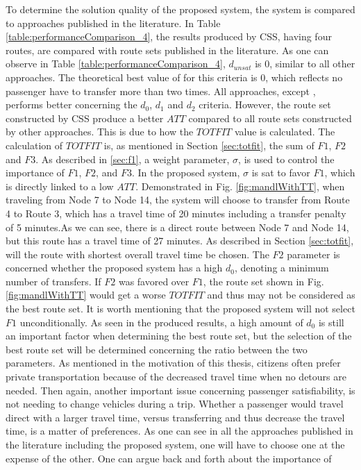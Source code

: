 
To determine the solution quality of the proposed system, the system is compared to approaches published in the literature. In Table \vref{table:performanceComparison_4}, the results produced by CSS, having four routes, are compared with route sets published in the literature. As one can observe in Table \vref{table:performanceComparison_4},  $d_{unsat}$ is 0, similar to all other approaches. The theoretical best value of for this criteria is 0, which reflects no passenger have to transfer more than two times. All approaches, except \citep{mandl79, kidwai98, chakroborty02}, performs better concerning the $d_0$, $d_1$ and $d_2$ criteria. However, the route set constructed by CSS produce a better $ATT$ compared to all route sets constructed by other approaches. This is due to how the $TOTFIT$ value is calculated. The calculation of $TOTFIT$ is, as mentioned in Section \vref{sec:totfit}, the sum of $F1$, $F2$ and $F3$. As described in \vref{sec:f1}, a weight parameter, $\sigma$, is used to control the importance of $F1$, $F2$, and $F3$. In the proposed system, $\sigma$ is sat to favor $F1$, which is directly linked to a low $ATT$. Demonstrated in Fig. \vref{fig:mandlWithTT}, when traveling from Node 7 to Node 14, the system will choose to transfer from Route 4 to Route 3, which has a travel time of 20 minutes including a transfer penalty of 5 minutes.As we can see, there is a direct route between Node 7 and Node 14, but this route has a travel time of 27 minutes. As described in Section \vref{sec:totfit}, will the route with shortest overall travel time be chosen. The $F2$ parameter is concerned whether the proposed system has a high $d_0$, denoting a minimum number of transfers. If $F2$ was favored over $F1$, the route set shown in Fig. \vref{fig:mandlWithTT} would get a worse $TOTFIT$ and thus may not be considered as the best route set. It is worth mentioning that the proposed system will not select $F1$ unconditionally. As seen in the produced results, a high amount of $d_0$ is still an important factor when determining the best route set, but the selection of the best route set will be determined concerning the ratio between the two parameters. As mentioned in the motivation of this thesis, citizens often prefer private transportation because of the decreased travel time when no detours are needed. Then again, another important issue concerning passenger satisfiability, is not needing to change vehicles during a trip. Whether a passenger would travel direct with a larger travel time, versus transferring and thus decrease the travel time, is a matter of preferences. As one can see in all the approaches published in the literature including the proposed system, one will have to choose one at the expense of the other. One can argue back and forth about the importance of 